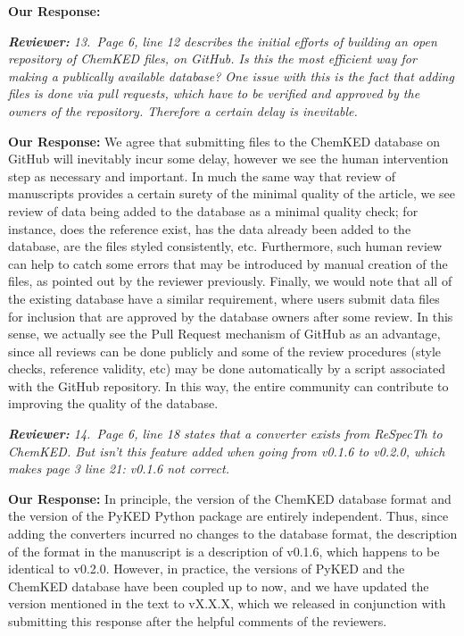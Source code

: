 \documentclass[a4paper,10pt]{elsarticle}
\newenvironment{reviewer}{\vspace{0.5\baselineskip}\begingroup\itshape\textbf{Reviewer:}}{\endgroup}
\newenvironment{response}{\textbf{Our Response:}}{\vspace{0.5\baselineskip}}
\begin{document}
\begin{response}

\end{response}

\begin{reviewer}
    13.~Page 6, line 12 describes the initial efforts of building an open repository of ChemKED
    files, on GitHub. Is this the most efficient way for making a publically available database? One
    issue with this is the fact that adding files is done via pull requests, which have to be
    verified and approved by the owners of the repository. Therefore a certain delay is inevitable.
\end{reviewer}

\begin{response}
    We agree that submitting files to the ChemKED database on GitHub will inevitably incur some
    delay, however we see the human intervention step as necessary and important. In much the same
    way that review of manuscripts provides a certain surety of the minimal quality of the article,
    we see review of data being added to the database as a minimal quality check; for instance, does
    the reference exist, has the data already been added to the database, are the files styled
    consistently, etc. Furthermore, such human review can help to catch some errors that may be
    introduced by manual creation of the files, as pointed out by the reviewer previously. Finally,
    we would note that all of the existing database have a similar requirement, where users submit
    data files for inclusion that are approved by the database owners after some review. In this
    sense, we actually see the Pull Request mechanism of GitHub as an advantage, since all reviews
    can be done publicly and some of the review procedures (style checks, reference validity, etc)
    may be done automatically by a script associated with the GitHub repository. In this way, the
    entire community can contribute to improving the quality of the database.
\end{response}

\begin{reviewer}
    14.~Page 6, line 18 states that a converter exists from ReSpecTh to ChemKED. But isn't this
    feature added when going from v0.1.6 to v0.2.0, which makes page 3 line 21: v0.1.6 not correct.
\end{reviewer}

\begin{response}
    In principle, the version of the ChemKED database format and the version of the PyKED Python
    package are entirely independent. Thus, since adding the converters incurred no changes to the
    database format, the description of the format in the manuscript is a description of v0.1.6,
    which happens to be identical to v0.2.0. However, in practice, the versions of PyKED and the
    ChemKED database have been coupled up to now, and we have updated the version mentioned in the
    text to vX.X.X, which we released in conjunction with submitting this response after the helpful
    comments of the reviewers.
\end{response}
\end{document}
